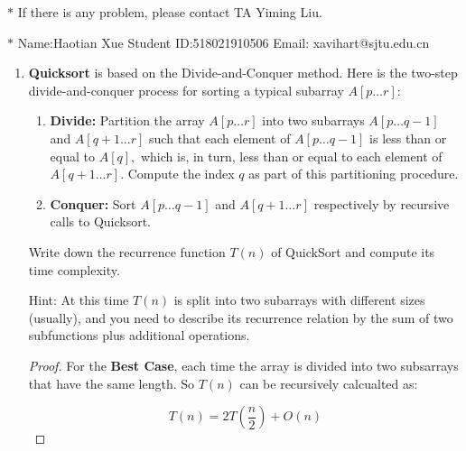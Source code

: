 \documentclass[12pt,a4paper]{article}
\theoremstyle{definition}
\begin{document}
\noindent

\noindent{}
\begin{center}
\footnotesize{\color{red}$*$ If there is any problem, please contact TA Yiming Liu.}

\footnotesize{\color{blue}$*$ Name:Haotian Xue \quad Student ID:518021910506 \quad Email: xavihart@sjtu.edu.cn}
\end{center}

\begin{enumerate}
    \item
    \textbf{Quicksort} is based on the Divide-and-Conquer method. Here is the two-step divide-and-conquer process for sorting a typical subarray $A[p \ldots r]$:
    \begin{enumerate}

    	\item
    	\textbf{Divide:} Partition the array $A[p \ldots r]$ into two subarrays $A[p \ldots q-1]$ and $A[q+1 \ldots r]$ such that each element of $A[p \ldots q-1]$ is less than or equal to $A[q],$ which is, in turn, less than or equal to each element of $A[q+1 \ldots r].$ Compute the index $q$ as part of this partitioning procedure.
    	
    	\item
    	\textbf{Conquer:} Sort $A[p \ldots q-1]$ and $A[q+1 \ldots r]$ respectively by recursive calls to Quicksort.
    	
    \end{enumerate}
    Write down the recurrence function $T(n)$ of QuickSort and compute its time complexity.

    {\color{purple}Hint: At this time $T(n)$ is split into two subarrays with different sizes (usually), and you need to describe its recurrence relation by the sum of two subfunctions plus additional operations.}
	
	\begin{proof}

	For the \textbf{Best Case}, each time the array is divided into two subsarrays that have the same length. So $T(n)$ can be recursively calcualted as:
	
	\begin{equation*}
        T(n) = 2T(\frac{n}{2}) + O(n) 
	\end{equation*}
	

\end{proof}
\end{enumerate}
\end{document}
